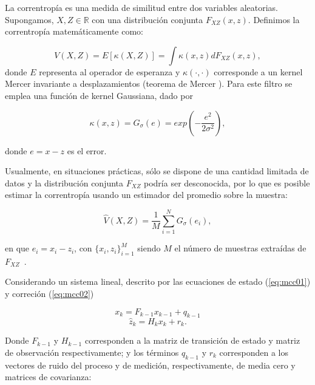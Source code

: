La correntrop\'ia es una medida de similitud entre dos variables aleatorias. Supongamos, $X,Z \in \mathbb{R}$ con una distribuci\'on conjunta $F_{XZ} (x,z)$. Definimos la correntrop\'ia matem\'aticamente como:

\begin{equation}
V(X,Z) = E[\kappa(X,Z)] = \int \kappa(x,z) dF_{XZ} (x,z),
\label{eq:eqcorr}
\end{equation}
\noindent
donde $E$ representa al operador de esperanza y $\kappa(\cdot,\cdot)$ corresponde a un kernel Mercer invariante a desplazamientos (teorema de Mercer \cite{mercer}). Para este filtro se emplea una funci\'on de kernel Gaussiana, dado por

\begin{equation}
\kappa(x, z) = G_{\sigma} (e) = exp \left(-\dfrac{e^2}{2\sigma^2} \right),
\label{eq:eqkappa}
\end{equation}

donde $e=x-z$ es el error.
\bigskip

Usualmente, en situaciones pr\'acticas, s\'olo se dispone de una cantidad limitada de datos y la distribuci\'on conjunta $F_{XZ}$ podr\'ia ser desconocida, por lo que es posible estimar la correntrop\'ia usando un estimador del promedio sobre la muestra:

\begin{equation}
\hat{V}(X,Z) = \dfrac{1}{M} \sum_{i=1}^N G_{\sigma} (e_i),
\label{eq:eqcoor_est}
\end{equation} 

en que $e_i = x_i - z_i$, con $\{x_i,z_i\}_{i=1}^M$ siendo $M$ el n\'umero de muestras extra\'idas de $F_{XZ}$~\cite{badong}.
\bigskip

Considerando un sistema lineal, descrito por las ecuaciones de estado (\ref{eq:mcc01}) y correci\'on (\ref{eq:mcc02}) 

\begin{equation}
x_{k} = F_{k-1}x_{k-1} + q_{k-1}
\label{eq:mcc01}
\end{equation}
\begin{equation}
\hat{z}_k = H_k x_{k} + r_k.
\label{eq:mcc02}
\end{equation}

Donde $F_{k-1}$ y $H_{k-1}$ corresponden a la matriz de transici\'on de estado y matriz de observaci\'on respectivamente; y los t\'erminos $q_{k-1}$ y $r_k$ corresponden a los vectores de ruido del proceso y de medici\'on, respectivamente, de media cero y matrices de covarianza:
\bigskip

